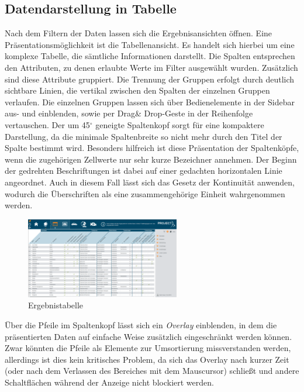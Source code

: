 \subsection{Datendarstellung in Tabelle}
Nach dem Filtern der Daten lassen sich die Ergebnisansichten öffnen. Eine Präsentationsmöglichkeit ist die Tabellenansicht. Es handelt sich hierbei um eine komplexe Tabelle, die sämtliche Informationen darstellt. Die Spalten entsprechen den Attributen, zu denen erlaubte Werte im Filter ausgewählt wurden. Zusätzlich sind diese Attribute gruppiert. Die Trennung der Gruppen erfolgt durch deutlich sichtbare Linien, die vertikal zwischen den Spalten der einzelnen Gruppen verlaufen. Die einzelnen Gruppen lassen sich über Bedienelemente in der Sidebar aus- und einblenden, sowie per Drag\& Drop-Geste in der Reihenfolge vertauschen. Der um 45$^{\circ}$ geneigte Spaltenkopf sorgt für eine kompaktere Darstellung, da die minimale Spaltenbreite so nicht mehr durch den Titel der Spalte bestimmt wird. Besonders hilfreich ist diese Präsentation der Spaltenköpfe, wenn die zugehörigen Zellwerte nur sehr kurze Bezeichner annehmen. Der Beginn der gedrehten Beschriftungen ist dabei auf einer gedachten horizontalen Linie angeordnet. Auch in diesem Fall lässt sich das Gesetz der Kontinuität anwenden, wodurch die Überschriften als eine zusammengehörige Einheit wahrgenommen werden.\par
\begin{figure}[H]
 \centering
 \includegraphics[width=0.6\textwidth]{grafiken/full_result_table.png}
 \caption{Ergebnistabelle}
 \label{fig:resultTable}
\end{figure}
Über die Pfeile im Spaltenkopf lässt sich ein \textit{Overlay} einblenden, in dem die präsentierten Daten auf einfache Weise zusätzlich eingeschränkt werden können. Zwar könnten die Pfeile als Elemente zur Umsortierung missverstanden werden, allerdings ist dies kein kritisches Problem, da sich das Overlay nach kurzer Zeit (oder nach dem Verlassen des Bereiches mit dem Mauscursor) schließt und andere Schaltflächen während der Anzeige nicht blockiert werden.\par
